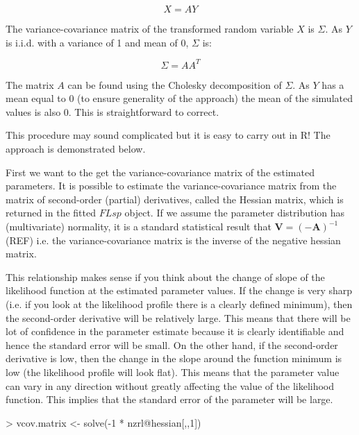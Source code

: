 \documentclass[a4paper]{article}
\begin{document}
\begin{equation}
X = A Y
\end{equation}

The variance-covariance matrix of the transformed random variable $X$ is $\Sigma$.
As $Y$ is i.i.d. with a variance of 1 and mean of 0, $\Sigma$ is:

\begin{equation}
\Sigma = A A^T
\end{equation}

The matrix $A$ can be found using the Cholesky decomposition of $\Sigma$. As $Y$ has a mean equal to 0 (to ensure generality of the approach) the mean of the simulated values is also 0. This is straightforward to correct.

This procedure may sound complicated but it is easy to carry out in R!
The approach is demonstrated below.

First we want to the get the variance-covariance matrix of the estimated parameters.
It is possible to estimate the variance-covariance matrix from the matrix of second-order (partial) derivatives, called the Hessian matrix,
which is returned in the fitted $FLsp$ object.
If we assume the parameter distribution has (multivariate) normality, it is a standard statistical result that $ \mathbf{V} = (-\mathbf{A})^{-1}$ (REF)
i.e. the variance-covariance matrix is the inverse of the negative hessian matrix.

This relationship makes sense if you think about the change of slope of the likelihood function at the estimated parameter values.
If the change is very sharp (i.e. if you look at the likelihood profile there is a clearly defined minimum),
then the second-order derivative will be relatively large. This means that there will be lot of confidence in the parameter estimate because
it is clearly identifiable and hence the standard error will be small.
On the other hand, if the second-order derivative is low, then the change in the slope around the function minimum is low (the likelihood profile will look flat).
This means that the parameter value can vary in any direction without greatly affecting the value of the likelihood function.
This implies that the standard error of the parameter will be large.

\begin{center}
\begin{minipage}[H]{0.95\textwidth}%
\begin{shaded}%
\begin{Schunk}
\begin{Sinput}
> vcov.matrix <- solve(-1 * nzrl@hessian[,,1])
\end{Sinput}
\end{Schunk}
\end{shaded}%
\end{minipage}
\end{center}
\end{document}
